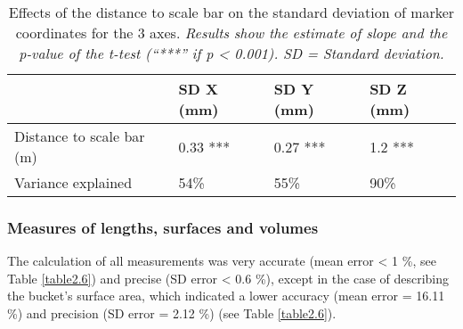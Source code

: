 \begin{table}[htbp]
  \centering
  \normalsize
  \caption[Effects of the distance to scale bar on the standard deviation of marker coordinates for the 3 axes.]{Effects of the distance to scale bar on the standard deviation of marker coordinates for the 3 axes. \textit{Results show the estimate of slope and the p-value of the t-test (“***” if p < 0.001). SD = Standard deviation.}}
  \label{table2.5}
    \begin{tabular}{@{}llll@{}}
\toprule
                          & \textbf{SD X (mm)} & \textbf{SD Y (mm)} & \textbf{SD Z (mm)} \\ \midrule
Distance to scale bar (m) & 0.33 ***           & 0.27 ***           & 1.2 ***            \\
Variance explained        & 54\%               & 55\%               & 90\%               \\ \bottomrule
\end{tabular}
\end{table}

\subsubsection{Measures of lengths, surfaces and volumes}\label{chapitre2_3.2.2}
The calculation of all measurements was very accurate (mean error < 1 \%, see Table \ref{table2.6}) and precise (SD error < 0.6 \%), except in the case of describing the bucket’s surface area, which indicated a lower accuracy (mean error = 16.11 \%) and precision (SD error = 2.12 \%) (see Table \ref{table2.6}).


